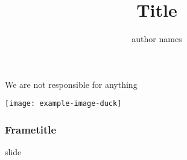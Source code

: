 \documentclass{beamer}
\title{Title}
\author{author names}
\begin{document}
{
    {
        \vskip-10pt
        We are not responsible for anything

      \leavevmode%
      \texttt{[image: example-image-duck]}%
    }


    \begin{frame}
    \titlepage
    \end{frame}
}

\begin{frame}
\frametitle{Frametitle}
slide 
\end{frame}
\end{document}
